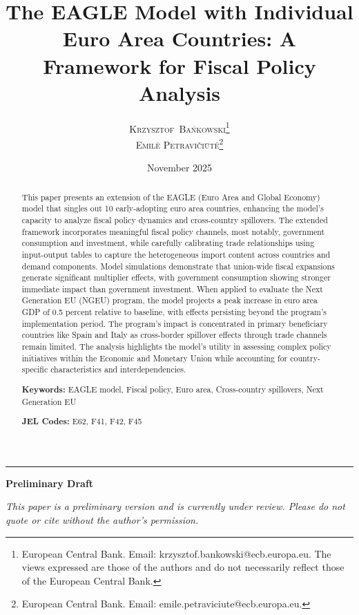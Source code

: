 \documentclass[a4paper,11pt]{article}
\title{\texorpdfstring{\vspace{-15mm}\fontsize{20pt}{24pt}\selectfont\textbf{The EAGLE Model with Individual Euro Area Countries: A Framework for Fiscal Policy Analysis}}{The EAGLE Model with Individual Euro Area Countries: A Framework for Fiscal Policy Analysis}} %
\author{
\large {\textsc{\texorpdfstring{Krzysztof~Ba\'nkowski}{Krzysztof Bankowski}\footnote{European Central Bank. Email: krzysztof.bankowski@ecb.europa.eu. The views expressed are those of the authors and do not necessarily reflect those of the European Central Bank.}}}\\[2mm]
{\textsc{\texorpdfstring{Emilė Petravičiūtė}{Emile Petraviciute}\footnote{European Central Bank. Email: emile.petraviciute@ecb.europa.eu.}}}\\[2mm]
}
\date{November 2025}
\numberwithin{equation}{section}
\begin{document}
\maketitle %

\begin{center}
    \vspace{-6mm}
    \textcolor{linkcol}{\rule{0.32\textwidth}{1pt}}
\end{center}

\begin{center}
    \textbf{\Large{Preliminary Draft}}

    \textit{This paper is a preliminary version and is currently under review. Please do not quote or cite without the author's permission.}
\end{center}

\begin{abstract}
This paper presents an extension of the EAGLE (Euro Area and Global Economy) model that singles out 10 early-adopting euro area countries, enhancing the model’s capacity to analyze fiscal policy dynamics and cross-country spillovers.
The extended framework incorporates meaningful fiscal policy channels, most notably, government consumption and investment, while carefully calibrating trade relationships using input-output tables to capture the heterogeneous import content across countries and demand components.
Model simulations demonstrate that union-wide fiscal expansions generate significant multiplier effects, with government consumption showing stronger immediate impact than government investment.
When applied to evaluate the Next Generation EU (NGEU) program, the model projects a peak increase in euro area GDP of 0.5 percent relative to baseline, with effects persisting beyond the program's implementation period.
The program's impact is concentrated in primary beneficiary countries like Spain and Italy as cross-border spillover effects through trade channels remain limited.
The analysis highlights the model's utility in assessing complex policy initiatives within the Economic and Monetary Union while accounting for country-specific characteristics and interdependencies.

\bigskip

\noindent\textbf{Keywords:} EAGLE model, Fiscal policy, Euro area, Cross-country spillovers, Next Generation EU

\bigskip

\noindent\textbf{JEL Codes:} E62, F41, F42, F45

\bigskip

\clearpage

\pagebreak

\end{abstract}
\end{document}
